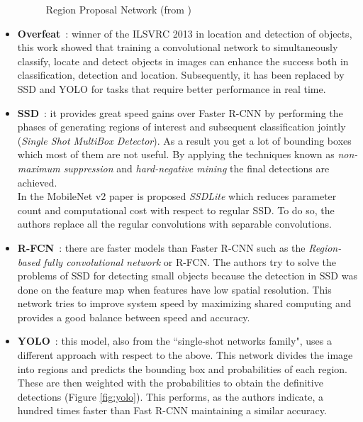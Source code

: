 \begin{itemize}
\begin{figure}[H]
\begin{center}
    \caption{Region Proposal Network (from \cite{ren2015faster})}
    \label{fig:fasterrcnn}
    \end{center}
    \end{figure}
\item \textbf{Overfeat}~\cite{sermanet2013overfeat}: winner of the ILSVRC 2013 in location and detection of objects, this work showed that training a convolutional network to simultaneously classify, locate and detect objects in images can enhance the success both in classification, detection and location. Subsequently, it has been replaced by SSD and YOLO for tasks that require better performance in real time.
\item \textbf{SSD}~\cite{liu2016ssd}: it provides great speed gains over Faster R-CNN by performing the phases of generating regions of interest and subsequent classification jointly (\textit{Single Shot MultiBox Detector}). As a result you get a lot of bounding boxes which most of them are not useful. By applying the techniques known as \textit{non-maximum suppression} and \textit{hard-negative mining} the final detections are achieved.\\
In the MobileNet v2 paper \cite{sandler2018mobilenetv2} is proposed \textit{SSDLite} which reduces parameter count and computational cost with respect to regular SSD. To do so, the authors replace all the regular convolutions with separable convolutions.
\item \textbf{R-FCN}~\cite{dai2016r}: there are faster models than Faster R-CNN such as the \textit{Region-based fully convolutional network} or R-FCN. The authors try to solve the problems of SSD for detecting small objects because the detection in SSD was done on the feature map when features have low spatial resolution. This network tries to improve system speed by maximizing shared computing and provides a good balance between speed and accuracy.
\item \textbf{YOLO}~\cite{redmon2016you}: this model, also from the ``single-shot networks family", uses a different approach with respect to the above. This network divides the image into regions and predicts the bounding box and probabilities of each region. These are then weighted with the probabilities to obtain the definitive detections (Figure \ref{fig:yolo}). This performs, as the authors indicate, a hundred times faster than Fast R-CNN maintaining a similar accuracy.\\
\begin{figure}[H]
\begin{center}

\end{center}
\end{figure}
\end{itemize}
